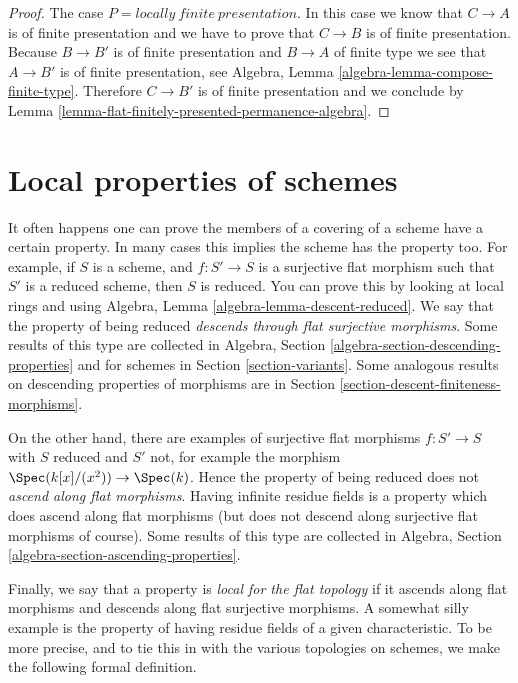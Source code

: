 \begin{proof}
\medskip\noindent
The case $P = locally\ finite\ presentation$.
In this case we know that $C \to A$ is of finite presentation and
we have to prove that $C \to B$ is of finite presentation.
Because $B \to B'$ is of finite presentation and $B \to A$
of finite type we see that $A \to B'$ is of finite presentation, see
Algebra, Lemma \ref{algebra-lemma-compose-finite-type}.
Therefore $C \to B'$ is of finite presentation and we conclude by
Lemma \ref{lemma-flat-finitely-presented-permanence-algebra}.
\end{proof}










\section{Local properties of schemes}
\label{section-descending-properties}

\noindent
It often happens one can prove the members of a covering of a scheme
have a certain property. In many cases this implies the scheme has the
property too. For example, if $S$ is a scheme, and $f : S' \to S$
is a surjective flat morphism such that $S'$ is a reduced scheme, then $S$ is
reduced. You can prove this by looking at local rings and using
Algebra, Lemma \ref{algebra-lemma-descent-reduced}.
We say that the property of being reduced
{\it descends through flat surjective morphisms}.
Some results of this type are collected in
Algebra, Section \ref{algebra-section-descending-properties} and
for schemes in Section \ref{section-variants}.
Some analogous results on descending properties
of morphisms are in Section \ref{section-descent-finiteness-morphisms}.

\medskip\noindent
On the other hand, there are examples of surjective flat morphisms
$f : S' \to S$ with $S$ reduced and $S'$ not, for example the morphism
$\Spec(k[x]/(x^2)) \to \Spec(k)$. Hence the property of
being reduced does not {\it ascend along flat morphisms}. Having infinite
residue fields is a property which does ascend along flat morphisms (but
does not descend along surjective flat morphisms of course). Some results
of this type are collected in
Algebra, Section \ref{algebra-section-ascending-properties}.

\medskip\noindent
Finally, we say that a property is {\it local for the flat topology}
if it ascends along flat morphisms and descends along flat surjective
morphisms. A somewhat silly example is the property of having residue
fields of a given characteristic. To be more precise, and to tie this in
with the various topologies on schemes, we make the following
formal definition.

